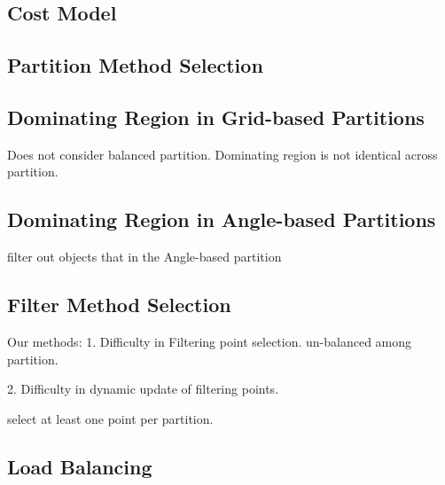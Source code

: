 \subsection{Cost Model}


\subsection{Partition Method Selection}

\subsection{Dominating Region in Grid-based Partitions}
Does not consider balanced partition.
Dominating region is not identical across partition.

\subsection{Dominating Region in Angle-based Partitions}
filter out objects that in the Angle-based partition

\subsection{Filter Method Selection}

Our methods:
1. Difficulty in Filtering point selection.
un-balanced among partition.  


2. Difficulty in dynamic update of filtering points.



select at least one point per partition.


\subsection{Load Balancing}
\label{ref:loadBalancing}